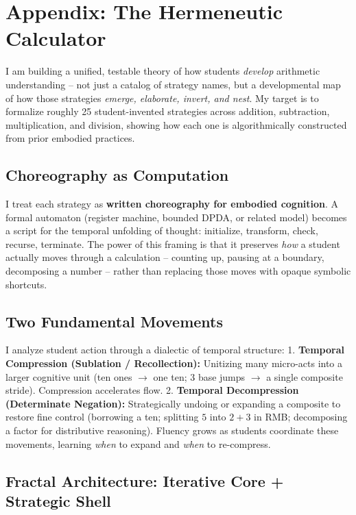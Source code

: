 \documentclass[12pt]{book}
\begin{document}
\printbibliography[heading=subbibliography]


\section{Appendix: The Hermeneutic Calculator}

I am building a unified, testable theory of how students \emph{develop}
arithmetic understanding -- not just a catalog of strategy names, but a
developmental map of how those strategies \emph{emerge, elaborate,
invert, and nest}. My target is to formalize roughly 25 student-invented
strategies across addition, subtraction, multiplication, and division,
showing how each one is algorithmically constructed from prior embodied
practices.

\subsection{Choreography as
Computation}\label{choreography-as-computation}

I treat each strategy as \textbf{written choreography for embodied
cognition}. A formal automaton (register machine, bounded DPDA, or
related model) becomes a script for the temporal unfolding of thought:
initialize, transform, check, recurse, terminate. The power of this
framing is that it preserves \emph{how} a student actually moves through
a calculation -- counting up, pausing at a boundary, decomposing a
number -- rather than replacing those moves with opaque symbolic
shortcuts.

\subsection{Two Fundamental Movements}\label{two-fundamental-movements}

I analyze student action through a dialectic of temporal structure: 1.
\textbf{Temporal Compression (Sublation / Recollection):} Unitizing many
micro-acts into a larger cognitive unit (ten ones \(\to\) one ten; 3
base jumps \(\to\) a single composite stride). Compression accelerates
flow. 2. \textbf{Temporal Decompression (Determinate Negation):}
Strategically undoing or expanding a composite to restore fine control
(borrowing a ten; splitting \(5\) into \(2+3\) in RMB; decomposing a
factor for distributive reasoning). Fluency grows as students coordinate
these movements, learning \emph{when} to expand and \emph{when} to
re-compress.

\subsection{Fractal Architecture: Iterative Core + Strategic
Shell}\label{fractal-architecture-iterative-core-strategic-shell}
\end{document}
